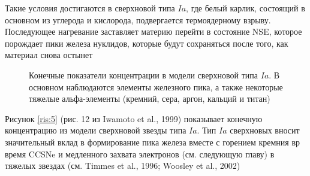 \documentclass[%
bachelor,    %
natbib,      %
subf,        %
href,        %
colorlinks,  %
]{disser}
\begin{document}
Такие условия достигаются в сверхновой типа $Ia$, где белый карлик, состоящий в основном из углерода и кислорода, подвергается термоядерному взрыву. Последующее нагревание заставляет материю перейти в состояние NSE, которое порождает пики железа нуклидов, которые будут сохраняться после того, как материал снова остынет

\begin{figure}[h]
	\caption{Конечные показатели концентрации в модели сверхновой типа $Ia$. В основном наблюдаются элементы железного пика, а также некоторые тяжелые альфа-элементы (кремний, сера, аргон, кальций и титан)}
\end{figure}

Рисунок \ref{ris:5} (рис. 12 из Iwamoto et al., 1999) показывает конечную концентрацию из модели сверхновой звезды типа $Ia$. Тип $Ia$ сверхновых вносит значительный вклад в формирование пика железа вместе с горением кремния вр время CCSNe и медленного захвата электронов (см. следующую главу) в тяжелых звездах (см. Timmes et al., 1996; Woosley et al., 2002)
\end{document}
